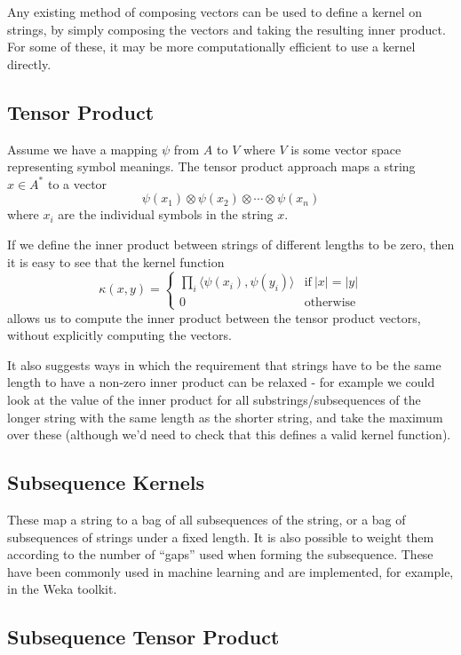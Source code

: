 \documentclass{article}
\begin{document}
Any existing method of composing vectors can be used to define a
kernel on strings, by simply composing the vectors and taking the
resulting inner product. For some of these, it may be more
computationally efficient to use a kernel directly.

\subsection*{Tensor Product}

Assume we have a mapping $\psi$ from $A$ to $V$ where $V$ is some
vector space representing symbol meanings. The tensor product approach
maps a string $x \in A^*$ to a vector
$$\psi(x_1)\otimes \psi(x_2)\otimes \cdots \otimes \psi(x_n)$$
where $x_i$ are the individual symbols in the string $x$.

If we define the inner product between strings of different lengths to
be zero, then it is easy to see that the kernel function
$$\kappa(x,y) = \left\{
\begin{array}{ll}
\prod_{i}\langle \psi(x_i), \psi(y_i)\rangle & \textrm{if}\ |x| = |y|\\
0 & \textrm{otherwise}
\end{array}
\right.$$
allows us to compute the inner product between the tensor product
vectors, without explicitly computing the vectors.

It also suggests ways in which the requirement that strings have to be
the same length to have a non-zero inner product can be relaxed - for
example we could look at the value of the inner product for all
substrings/subsequences of the longer string with the same length as
the shorter string, and take the maximum over these (although we'd
need to check that this defines a valid kernel function).

\subsection*{Subsequence Kernels}

These map a string to a bag of all subsequences of the string, or a bag
of subsequences of strings under a fixed length. It is also possible
to weight them according to the number of ``gaps'' used when forming
the subsequence. These have been commonly used in machine learning and
are implemented, for example, in the Weka toolkit.

\subsection*{Subsequence Tensor Product}
\end{document}
